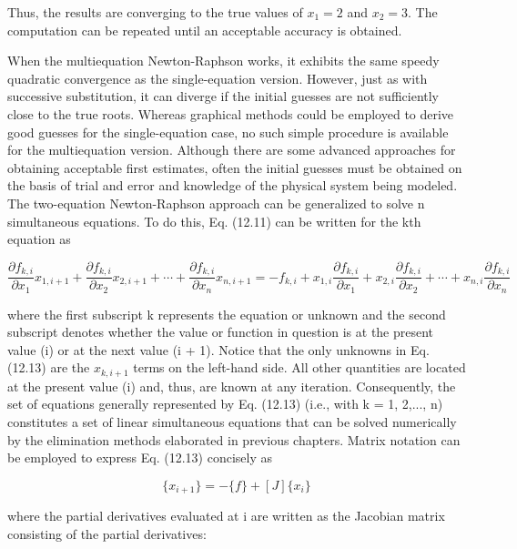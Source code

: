 \documentclass[../main.tex]{subfiles}
\begin{document}
Thus, the results are converging to the true values of $x_{1}=2$ and $x_{2}=3$. The computation
can be repeated until an acceptable accuracy is obtained.

When the multiequation Newton-Raphson works, it exhibits the same speedy quadratic
convergence as the single-equation version. However, just as with successive substitution,
it can diverge if the initial guesses are not sufficiently close to the true roots. Whereas
graphical methods could be employed to derive good guesses for the single-equation case,
no such simple procedure is available for the multiequation version. Although there are
some advanced approaches for obtaining acceptable first estimates, often the initial guesses
must be obtained on the basis of trial and error and knowledge of the physical system being
modeled.
The two-equation Newton-Raphson approach can be generalized to solve n simultaneous equations. To do this, Eq. (12.11) can be written for the kth equation as

\begin{equation}
\frac{\partial f_{k,i}}{\partial x_{1}}x_{1,i+1}+
\frac{\partial f_{k,i}}{\partial x_{2}}x_{2,i+1}+
\cdots +
\frac{\partial f_{k,i}}{\partial x_{n}}x_{n,i+1}=
-f_{k,i}+
x_{1,i}\frac{\partial f_{k,i}}{\partial x_{1}}+
x_{2,i}\frac{\partial f_{k,i}}{\partial x_{2}}+
\cdots+
x_{n,i}\frac{\partial f_{k,i}}{\partial x_{n}}
\tag{12.13}
\end{equation}

where the first subscript k represents the equation or unknown and the second subscript denotes whether the value or function in question is at the present value (i) or at the next value
(i + 1). Notice that the only unknowns in Eq. (12.13) are the $x_{k,i+1}$ terms on the left-hand
side. All other quantities are located at the present value (i) and, thus, are known at any
iteration. Consequently, the set of equations generally represented by Eq. (12.13) (i.e., with
k = 1, 2,..., n) constitutes a set of linear simultaneous equations that can be solved
numerically by the elimination methods elaborated in previous chapters.
Matrix notation can be employed to express Eq. (12.13) concisely as

\begin{equation}
[J]\{x_{i+1}\}=-\{f\}+[J]\{x_{i}\}
\tag{12.14}
\end{equation}

where the partial derivatives evaluated at i are written as the Jacobian matrix consisting of
the partial derivatives:
\end{document}
